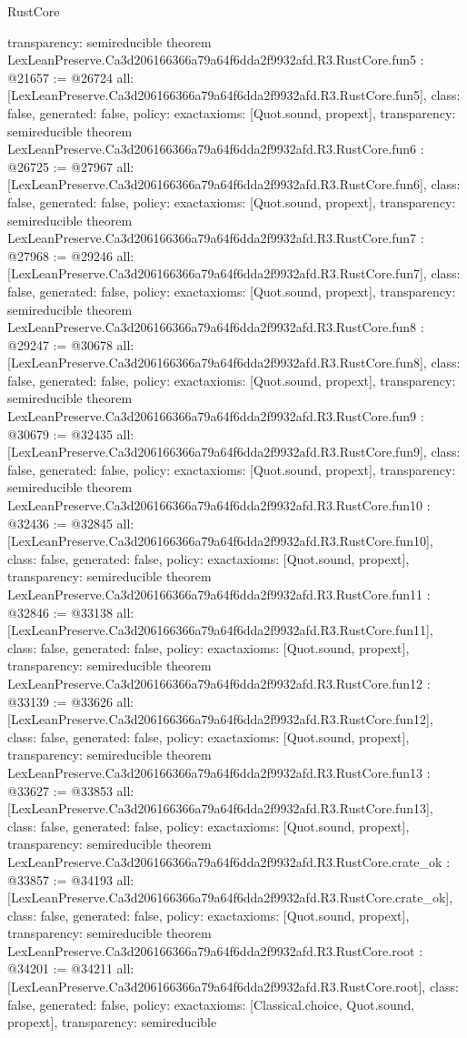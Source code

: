 \begin{lexlean}{RustCore}
\begin{coremodule}
{  transparency: semireducible
}
theorem LexLeanPreserve.Ca3d206166366a79a64f6dda2f9932afd.R3.RustCore.fun5 : @21657 := @26724 {
  all: [LexLeanPreserve.Ca3d206166366a79a64f6dda2f9932afd.R3.RustCore.fun5],
  class: false,
  generated: false,
  policy: exact{axioms: [Quot.sound, propext]},
  transparency: semireducible
}
theorem LexLeanPreserve.Ca3d206166366a79a64f6dda2f9932afd.R3.RustCore.fun6 : @26725 := @27967 {
  all: [LexLeanPreserve.Ca3d206166366a79a64f6dda2f9932afd.R3.RustCore.fun6],
  class: false,
  generated: false,
  policy: exact{axioms: [Quot.sound, propext]},
  transparency: semireducible
}
theorem LexLeanPreserve.Ca3d206166366a79a64f6dda2f9932afd.R3.RustCore.fun7 : @27968 := @29246 {
  all: [LexLeanPreserve.Ca3d206166366a79a64f6dda2f9932afd.R3.RustCore.fun7],
  class: false,
  generated: false,
  policy: exact{axioms: [Quot.sound, propext]},
  transparency: semireducible
}
theorem LexLeanPreserve.Ca3d206166366a79a64f6dda2f9932afd.R3.RustCore.fun8 : @29247 := @30678 {
  all: [LexLeanPreserve.Ca3d206166366a79a64f6dda2f9932afd.R3.RustCore.fun8],
  class: false,
  generated: false,
  policy: exact{axioms: [Quot.sound, propext]},
  transparency: semireducible
}
theorem LexLeanPreserve.Ca3d206166366a79a64f6dda2f9932afd.R3.RustCore.fun9 : @30679 := @32435 {
  all: [LexLeanPreserve.Ca3d206166366a79a64f6dda2f9932afd.R3.RustCore.fun9],
  class: false,
  generated: false,
  policy: exact{axioms: [Quot.sound, propext]},
  transparency: semireducible
}
theorem LexLeanPreserve.Ca3d206166366a79a64f6dda2f9932afd.R3.RustCore.fun10 : @32436 := @32845 {
  all: [LexLeanPreserve.Ca3d206166366a79a64f6dda2f9932afd.R3.RustCore.fun10],
  class: false,
  generated: false,
  policy: exact{axioms: [Quot.sound, propext]},
  transparency: semireducible
}
theorem LexLeanPreserve.Ca3d206166366a79a64f6dda2f9932afd.R3.RustCore.fun11 : @32846 := @33138 {
  all: [LexLeanPreserve.Ca3d206166366a79a64f6dda2f9932afd.R3.RustCore.fun11],
  class: false,
  generated: false,
  policy: exact{axioms: [Quot.sound, propext]},
  transparency: semireducible
}
theorem LexLeanPreserve.Ca3d206166366a79a64f6dda2f9932afd.R3.RustCore.fun12 : @33139 := @33626 {
  all: [LexLeanPreserve.Ca3d206166366a79a64f6dda2f9932afd.R3.RustCore.fun12],
  class: false,
  generated: false,
  policy: exact{axioms: [Quot.sound, propext]},
  transparency: semireducible
}
theorem LexLeanPreserve.Ca3d206166366a79a64f6dda2f9932afd.R3.RustCore.fun13 : @33627 := @33853 {
  all: [LexLeanPreserve.Ca3d206166366a79a64f6dda2f9932afd.R3.RustCore.fun13],
  class: false,
  generated: false,
  policy: exact{axioms: [Quot.sound, propext]},
  transparency: semireducible
}
theorem LexLeanPreserve.Ca3d206166366a79a64f6dda2f9932afd.R3.RustCore.crate_ok : @33857 := @34193 {
  all: [LexLeanPreserve.Ca3d206166366a79a64f6dda2f9932afd.R3.RustCore.crate_ok],
  class: false,
  generated: false,
  policy: exact{axioms: [Quot.sound, propext]},
  transparency: semireducible
}
theorem LexLeanPreserve.Ca3d206166366a79a64f6dda2f9932afd.R3.RustCore.root : @34201 := @34211 {
  all: [LexLeanPreserve.Ca3d206166366a79a64f6dda2f9932afd.R3.RustCore.root],
  class: false,
  generated: false,
  policy: exact{axioms: [Classical.choice, Quot.sound, propext]},
  transparency: semireducible
}


\end{coremodule}
\end{lexlean}
